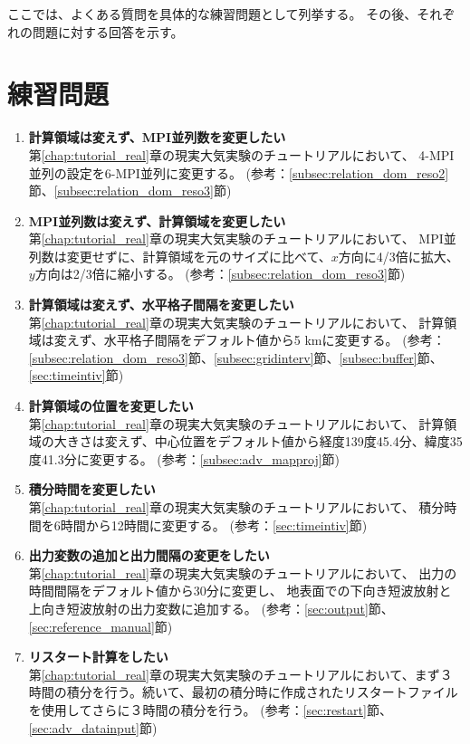 ここでは、よくある質問を具体的な練習問題として列挙する。
その後、それぞれの問題に対する回答を示す。


\section*{練習問題}

\begin{enumerate}
\item {\bf 計算領域は変えず、MPI並列数を変更したい}\\
第\ref{chap:tutorial_real}章の現実大気実験のチュートリアルにおいて、
4-MPI並列の設定を6-MPI並列に変更する。
(参考：\ref{subsec:relation_dom_reso2}節、\ref{subsec:relation_dom_reso3}節)

\item {\bf MPI並列数は変えず、計算領域を変更したい}\\
第\ref{chap:tutorial_real}章の現実大気実験のチュートリアルにおいて、
MPI並列数は変更せずに、計算領域を元のサイズに比べて、$x$方向に4/3倍に拡大、$y$方向は2/3倍に縮小する。
(参考：\ref{subsec:relation_dom_reso3}節)

\item {\bf 計算領域は変えず、水平格子間隔を変更したい}\\
第\ref{chap:tutorial_real}章の現実大気実験のチュートリアルにおいて、
計算領域は変えず、水平格子間隔をデフォルト値から5 kmに変更する。
(参考：\ref{subsec:relation_dom_reso3}節、\ref{subsec:gridinterv}節、\ref{subsec:buffer}節、\ref{sec:timeintiv}節)

\item {\bf 計算領域の位置を変更したい}\\
第\ref{chap:tutorial_real}章の現実大気実験のチュートリアルにおいて、
計算領域の大きさは変えず、中心位置をデフォルト値から経度139度45.4分、緯度35度41.3分に変更する。
(参考：\ref{subsec:adv_mapproj}節)

\item {\bf 積分時間を変更したい}\\
第\ref{chap:tutorial_real}章の現実大気実験のチュートリアルにおいて、
積分時間を6時間から12時間に変更する。
(参考：\ref{sec:timeintiv}節)

\item {\bf 出力変数の追加と出力間隔の変更をしたい}\\
第\ref{chap:tutorial_real}章の現実大気実験のチュートリアルにおいて、
出力の時間間隔をデフォルト値から30分に変更し、
地表面での下向き短波放射と上向き短波放射の出力変数に追加する。
(参考：\ref{sec:output}節、\ref{sec:reference_manual}節)

\item {\bf リスタート計算をしたい}\\
第\ref{chap:tutorial_real}章の現実大気実験のチュートリアルにおいて、まず３時間の積分を行う。続いて、最初の積分時に作成されたリスタートファイルを使用してさらに３時間の積分を行う。
(参考：\ref{sec:restart}節、\ref{sec:adv_datainput}節)


\end{enumerate}
